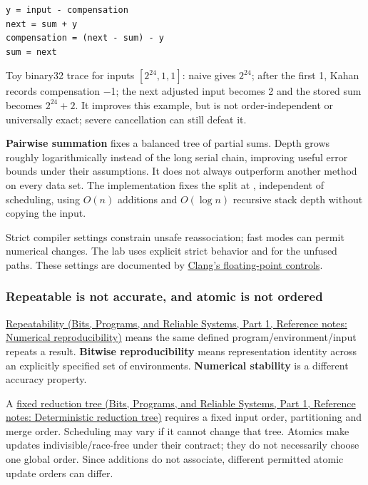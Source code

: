 \begin{verbatim}
y = input - compensation
next = sum + y
compensation = (next - sum) - y
sum = next
\end{verbatim}

Toy binary32 trace for inputs \([2^{24},1,1]\): naive gives \(2^{24}\); after the first 1, Kahan records compensation −1; the next adjusted input becomes 2 and the stored sum becomes \(2^{24}+2\). It improves this example, but is not order-independent or universally exact; severe cancellation can still defeat it.

\textbf{Pairwise summation} fixes a balanced tree of partial sums. Depth grows roughly logarithmically instead of the long serial chain, improving useful error bounds under their assumptions. It does not always outperform another method on every data set. The implementation fixes the split at , independent of scheduling, using \(O(n)\) additions and \(O(\log n)\) recursive stack depth without copying the input.

Strict compiler settings constrain unsafe reassociation; fast modes can permit numerical changes. The lab uses explicit strict behavior and  for the unfused paths. These settings are documented by \href{https://clang.llvm.org/docs/UsersManual.html\#controlling-floating-point-behavior}{Clang's floating-point controls}.

\subsubsection{Repeatable is not accurate, and atomic is not ordered}\label{05-engine-i-ch001-repeatable-is-not-accurate-and-atomic-is-not-ordered}

\hypertarget{05-engine-i-ch001-repeatable-is-not-accurate-and-atomic-is-not-ordered}{}

\href{../01-Bits-Programs-and-Reliable-Systems-P01/main.pdf\#appendix-5f1a2c3f97ff}{Repeatability (Bits, Programs, and Reliable Systems, Part 1, Reference notes: Numerical reproducibility)} means the same defined program/environment/input repeats a result. \textbf{Bitwise reproducibility} means representation identity across an explicitly specified set of environments. \textbf{Numerical stability} is a different accuracy property.

A \href{../01-Bits-Programs-and-Reliable-Systems-P01/main.pdf\#appendix-4c8e0238e7ee}{fixed reduction tree (Bits, Programs, and Reliable Systems, Part 1, Reference notes: Deterministic reduction tree)} requires a fixed input order, partitioning and merge order. Scheduling may vary if it cannot change that tree. Atomics make updates indivisible/race-free under their contract; they do not necessarily choose one global order. Since additions do not associate, different permitted atomic update orders can differ.

